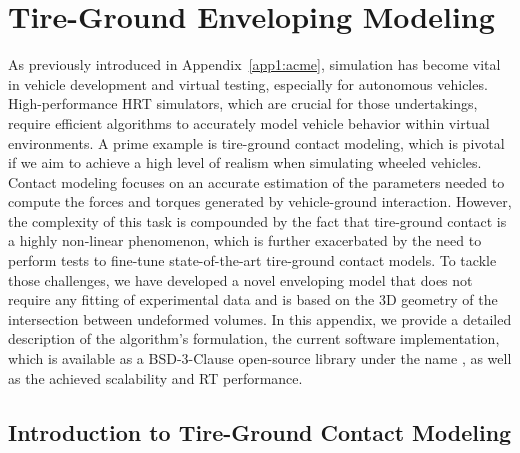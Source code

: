 
\chapter{Tire-Ground Enveloping Modeling}
\label{app2:enve}

As previously introduced in Appendix~\ref{app1:acme}, simulation has become vital in vehicle development and virtual testing, especially for autonomous vehicles. High-performance \ac{HRT} simulators, which are crucial for those undertakings, require efficient algorithms to accurately model vehicle behavior within virtual environments. A prime example is tire-ground contact modeling, which is pivotal if we aim to achieve a high level of realism when simulating wheeled vehicles. Contact modeling focuses on an accurate estimation of the parameters needed to compute the forces and torques generated by vehicle-ground interaction. However, the complexity of this task is compounded by the fact that tire-ground contact is a highly non-linear phenomenon, which is further exacerbated by the need to perform tests to fine-tune state-of-the-art tire-ground contact models. To tackle those challenges, we have developed a novel enveloping model that does not require any fitting of experimental data and is based on the 3D geometry of the intersection between undeformed volumes. In this appendix, we provide a detailed description of the algorithm's formulation, the current software implementation, which is available as a BSD-3-Clause open-source library under the name \Enve{}, as well as the achieved scalability and \ac{RT} performance.


\section{Introduction to Tire-Ground Contact Modeling}
\label{app2:sec:introduction}

